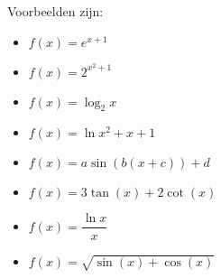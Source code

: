 \documentclass[12pt]{article}
\begin{document}
\begin{theorie}
Voorbeelden zijn:
\begin{multicols}{2}
  \begin{itemize}
    \item $\displaystyle f(x)=e^{x+1}$
    \item $\displaystyle f(x)=2^{x^2+1}$
    \item $\displaystyle f(x)=\log_2{x}$
    \item $\displaystyle f(x)=\ln{x^2+x+1}$
    \item $\displaystyle f(x)=a\sin(b(x+c))+d$
    \item $\displaystyle f(x)=3\tan(x)+2\cot(x)$
    \item $\displaystyle f(x)=\dfrac{\ln{x}}{x}$
    \item $\displaystyle f(x)=\sqrt{\sin(x)+\cos(x)}$
  \end{itemize}
\end{multicols}


\end{theorie}
\end{document}
